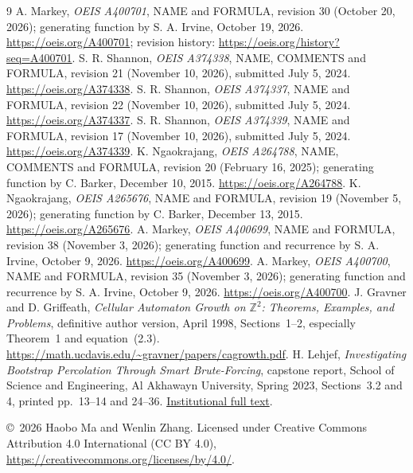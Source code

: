 \documentclass[11pt]{article}
\newcommand{\Z}{\mathbb Z}
\begin{document}
\begin{thebibliography}{9}
 A. Markey, \emph{OEIS A400701}, NAME and FORMULA,
revision 30 (October 20, 2026); generating function by S. A. Irvine,
October 19, 2026.
\url{https://oeis.org/A400701}; revision history:
\url{https://oeis.org/history?seq=A400701}.
 S. R. Shannon, \emph{OEIS A374338}, NAME, COMMENTS and
FORMULA, revision 21 (November 10, 2026), submitted July 5, 2024.
\url{https://oeis.org/A374338}.
 S. R. Shannon, \emph{OEIS A374337}, NAME and FORMULA,
revision 22 (November 10, 2026), submitted July 5, 2024.
\url{https://oeis.org/A374337}.
 S. R. Shannon, \emph{OEIS A374339}, NAME and FORMULA,
revision 17 (November 10, 2026), submitted July 5, 2024.
\url{https://oeis.org/A374339}.
 K. Ngaokrajang, \emph{OEIS A264788}, NAME, COMMENTS
and FORMULA, revision 20 (February 16, 2025); generating function by
C. Barker, December 10, 2015. \url{https://oeis.org/A264788}.
 K. Ngaokrajang, \emph{OEIS A265676}, NAME and FORMULA,
revision 19 (November 5, 2026); generating function by C. Barker,
December 13, 2015. \url{https://oeis.org/A265676}.
 A. Markey, \emph{OEIS A400699}, NAME and FORMULA,
revision 38 (November 3, 2026); generating function and recurrence by
S. A. Irvine, October 9, 2026. \url{https://oeis.org/A400699}.
 A. Markey, \emph{OEIS A400700}, NAME and FORMULA,
revision 35 (November 3, 2026); generating function and recurrence by
S. A. Irvine, October 9, 2026. \url{https://oeis.org/A400700}.
 J. Gravner and D. Griffeath,
\emph{Cellular Automaton Growth on $\Z^2$: Theorems, Examples, and Problems},
definitive author version, April 1998, Sections~1--2, especially
Theorem~1 and equation~(2.3).
\url{https://math.ucdavis.edu/~gravner/papers/cagrowth.pdf}.
 H. Lehjef,
\emph{Investigating Bootstrap Percolation Through Smart Brute-Forcing},
capstone report, School of Science and Engineering, Al Akhawayn University,
Spring 2023, Sections~3.2 and 4, printed pp.~13--14 and 24--36.
\href{https://cdn.aui.ma/sse-capstone-repository/pdf/spring-2023/INVESTIGATING\%20BOOTSTRAP\%20PERCOLATION\%20THROUGH\%20SMART\%20BRUTE-FORCING.pdf}{Institutional full text}.
\end{thebibliography}
\noindent\small\copyright\ 2026 Haobo Ma and Wenlin Zhang.
Licensed under Creative Commons Attribution 4.0 International (CC BY 4.0),
\url{https://creativecommons.org/licenses/by/4.0/}.
\end{document}
